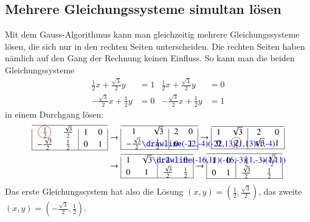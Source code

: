 \subsection{Mehrere Gleichungssysteme simultan lösen\label{simultan}}
Mit dem Gauss-Algorithmus kann man gleichzeitig mehrere Gleichungssysteme
lösen, die sich nur in den rechten Seiten unterscheiden.
Die rechten Seiten haben nämlich auf den Gang der Rechnung keinen
Einfluss.
So kann man die beiden Gleichungssysteme
\begin{align*}
\frac12x+\frac{\sqrt{3}}2y&=1
&
\frac12x+\frac{\sqrt{3}}2y&=0
\\
-\frac{\sqrt{3}}2x+\frac12y&=0
&
-\frac{\sqrt{3}}2x+\frac12y&=1
\end{align*}
in einem Durchgang lösen:
\begin{align*}
\begin{tabular}{|>{$}c<{$}>{$}c<{$}|>{$}c<{$}>{$}c<{$}|}
\hline
\frac12%
\begin{picture}(0,0)
\color{red}\put(-3.5,3){\circle{15}}
\end{picture}%
&\frac{\sqrt{3}}2&1&0\\
-\frac{\sqrt{3}}2&\frac12&0&1\\
\hline
\end{tabular}
&\rightarrow
\begin{tabular}{|>{$}c<{$}>{$}c<{$}|>{$}c<{$}>{$}c<{$}|}
\hline
1&\sqrt{3}&2&0\\
-\frac{\sqrt{3}}2%
\begin{picture}(0,0)
\color{blue}\drawline(-22,-4)(-22,13)(1,13)(1,-4)
\end{picture}%
&\frac12&0&1\\
\hline
\end{tabular}
\rightarrow
\begin{tabular}{|>{$}c<{$}>{$}c<{$}|>{$}c<{$}>{$}c<{$}|}
\hline
1&\sqrt{3}&2&0\\
0&2%
\begin{picture}(0,0)
\color{red}\put(-3,4){\circle{12}}
\end{picture}%
&\sqrt{3}&1\\
\hline
\end{tabular}
\\
&\rightarrow
\begin{tabular}{|>{$}c<{$}>{$}c<{$}|>{$}c<{$}>{$}c<{$}|}
\hline
1&\sqrt{3}%
\begin{picture}(0,0)
\color{blue}\drawline(-16,11)(-16,-3)(1,-3)(1,11)
\end{picture}%
&2&0\\
0&1&\frac{\sqrt{3}}2&\frac12\\
\hline
\end{tabular}
\rightarrow
\begin{tabular}{|>{$}c<{$}>{$}c<{$}|>{$}c<{$}>{$}c<{$}|}
\hline
1&0&\frac12&-\frac{\sqrt{3}}2\\
0&1&\frac{\sqrt{3}}2&\frac12\\
\hline
\end{tabular}
\end{align*}
Das erste Gleichungssystem hat also die Lösung
$(x,y)=(\frac12,\frac{\sqrt{3}}2)$,
das zweite
$(x,y)=(-\frac{\sqrt{3}}2, \frac12)$.

